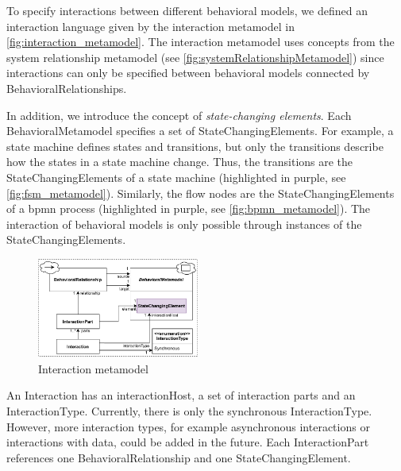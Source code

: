 \documentclass{jot}
\begin{document}
To specify interactions between different behavioral models, we defined an interaction language given by the interaction metamodel in \autoref{fig:interaction_metamodel}.
The interaction metamodel uses concepts from the system relationship metamodel (see \autoref{fig:systemRelationshipMetamodel}) since interactions can only be specified between behavioral models connected by \textsf{BehavioralRelationship}s.

In addition, we introduce the concept of \emph{state-changing elements}.
Each \textsf{BehavioralMetamodel} specifies a set of \textsf{StateChangingElement}s.
For example, a state machine defines states and transitions, but only the transitions describe how the states in a state machine change.
Thus, the transitions are the \textsf{StateChangingElement}s of a state machine (highlighted in purple, see \autoref{fig:fsm_metamodel}).
Similarly, the flow nodes are the \textsf{StateChangingElement}s of a \gls*{bpmn} process (highlighted in purple, see \autoref{fig:bpmn_metamodel}).
The interaction of behavioral models is only possible through instances of the \textsf{StateChangingElement}s.

\begin{figure}[h]
    \centering
    \includegraphics[width=0.475\textwidth]{figures/interaction_metamodel.pdf}
    \caption{Interaction metamodel}
    \label{fig:interaction_metamodel}
\end{figure}

An \textsf{Interaction} has an \textsf{interactionHost}, a set of interaction \textsf{parts} and an \textsf{InteractionType}.
Currently, there is only the \textsf{synchronous} \textsf{InteractionType}.
However, more interaction types, for example asynchronous interactions or interactions with data, could be added in the future.
Each \textsf{InteractionPart} references one \textsf{BehavioralRelationship} and one \textsf{StateChangingElement}.
\end{document}
